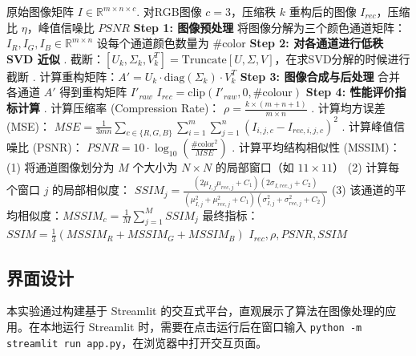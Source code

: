 	\begin{algorithm}[H]
		\caption{基于 SVD 的图像压缩与重构算法}
		\label{alg:svd_compression}
		\begin{algorithmic}[1]
			\Require 原始图像矩阵 $I \in \mathbb{R}^{m \times n \times c}$. 对RGB图像 $c = 3$，压缩秩 $k$
			\Ensure 重构后的图像 $I_{rec}$，压缩比 $\eta$，峰值信噪比 $PSNR$
			\State \textbf{Step 1: 图像预处理}
			\State 将图像分解为三个颜色通道矩阵：$I_R, I_G, I_B \in \mathbb{R}^{m \times n}$
			\State 设每个通道颜色数量为 \#color
			\State \textbf{Step 2: 对各通道进行低秩 SVD 近似}
			. 截断：$[U_k, \Sigma_k, V_k^T] = \text{Truncate}[U, \Sigma, V]$，在求SVD分解的时候进行截断
			. 计算重构矩阵：$A' = U_k \cdot \text{diag}(\Sigma_k) \cdot V_k^T$
			\EndFor
			\State
			\State \textbf{Step 3: 图像合成与后处理}
			\State 合并各通道 $A'$ 得到重构矩阵 $I'_{raw}$
			\State $I_{rec} = \text{clip}(I'_{raw}, 0, \text{\#colour})$ 
			\State
			\State \textbf{Step 4: 性能评价指标计算}
			. 计算压缩率 (Compression Rate)：
			\State \quad $\rho = \frac{k \times (m + n + 1)}{m \times n}$
			. 计算均方误差 (MSE)：
			\State \quad $MSE = \frac{1}{3mn} \sum_{c \in \{R,G,B\}} \sum_{i=1}^{m} \sum_{j=1}^{n} (I_{i,j,c} - I_{rec,i,j,c})^2$
			. 计算峰值信噪比 (PSNR)：
			\State \quad $PSNR = 10 \cdot \log_{10}\left(\frac{\text{\#color}^2}{MSE}\right)$
			. 计算平均结构相似性 (MSSIM)：
			\State (1) 将通道图像划分为 $M$ 个大小为 $N \times N$ 的局部窗口（如 $11 \times 11$）
			\State (2) 计算每个窗口 $j$ 的局部相似度：
			\State \quad $SSIM_j = \frac{(2\mu_{I,j}\mu_{rec,j} + C_1)(2\sigma_{I,rec,j} + C_2)}{(\mu_{I,j}^2 + \mu_{rec,j}^2 + C_1)(\sigma_{I,j}^2 + \sigma_{rec,j}^2 + C_2)}$
			\State (3) 该通道的平均相似度：$MSSIM_c = \frac{1}{M} \sum_{j=1}^M SSIM_j$
			\EndFor
			\State \quad 最终指标：$SSIM = \frac{1}{3} (MSSIM_R + MSSIM_G + MSSIM_B)$
			\State
			\State \Return $I_{rec}, \rho, PSNR, SSIM$
		\end{algorithmic}
	\end{algorithm}
	
	\subsection{界面设计}
	
	本实验通过构建基于 Streamlit 的交互式平台，直观展示了算法在图像处理的应用。在本地运行 Streamlit 时，需要在点击运行后在窗口输入 \texttt{python -m streamlit run app.py}，在浏览器中打开交互页面。
	
